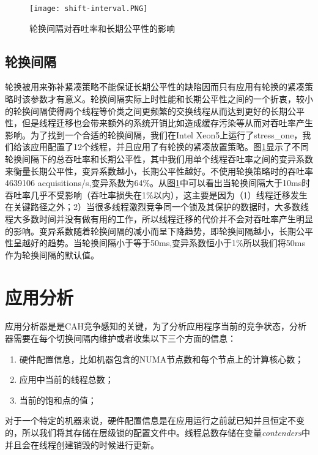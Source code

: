 \begin{figure}[t]
	\centering
	\texttt{[image: shift-interval.PNG]}
	\caption{轮换间隔对吞吐率和长期公平性的影响}
	\label{Fig:shift-interval}
\end{figure}

\subsection{轮换间隔}
轮换被用来弥补紧凑策略不能保证长期公平性的缺陷因而只有应用有轮换的紧凑策略时该参数才有意义。轮换间隔实际上时性能和长期公平性之间的一个折衷，较小的轮换间隔使得两个线程等价类之间更频繁的交换线程从而达到更好的长期公平性，但是线程迁移也会带来额外的系统开销比如造成缓存污染等从而对吞吐率产生影响。为了找到一个合适的轮换间隔，我们在Intel Xeon5上运行了stress\_one，我们给该应用配置了12个线程，并且应用了有轮换的紧凑放置策略。图\ref{Fig:shift-interval}显示了不同轮换间隔下的总吞吐率和长期公平性，其中我们用单个线程吞吐率之间的变异系数来衡量长期公平性，变异系数越小，长期公平性越好。不使用轮换策略时的吞吐率4639106 acquisitions/s,变异系数为64\%。从图\ref{Fig:shift-interval}中可以看出当轮换间隔大于10ms时吞吐率几乎不受影响（吞吐率损失在1\%以内），这主要是因为（1）线程迁移发生在关键路径之外；2）当很多线程激烈竞争同一个锁及其保护的数据时，大多数线程大多数时间并没有做有用的工作，所以线程迁移的代价并不会对吞吐率产生明显的影响。变异系数随着轮换间隔的减小而呈下降趋势，即轮换间隔越小，长期公平性呈越好的趋势。当轮换间隔小于等于50ms,变异系数恒小于1\%所以我们将50ms作为轮换间隔的默认值。

\section{应用分析}
应用分析器是是CAH竞争感知的关键，为了分析应用程序当前的竞争状态，分析器需要在每个切换间隔内维护或者收集以下三个方面的信息：
\begin{enumerate}
  \item 硬件配置信息，比如机器包含的NUMA节点数和每个节点上的计算核心数；
  \item 应用中当前的线程总数；
  \item 当前的饱和点的值；
\end{enumerate}
对于一个特定的机器来说，硬件配置信息是在应用运行之前就已知并且恒定不变的，所以我们将其存储在层级锁的配置文件中。线程总数存储在变量\emph{contenders}中并且会在线程创建销毁的时候进行更新。

